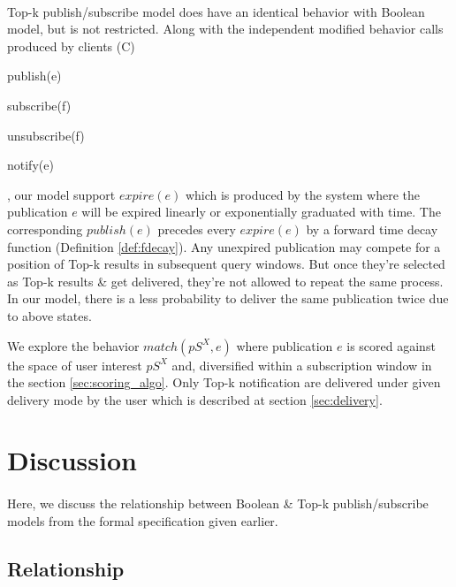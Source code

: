 \documentclass[a4paper,12pt,oneside]{book}
\theoremstyle{definition}
\theoremstyle{remark}
\begin{document}
\paragraph*{}
Top-k publish/subscribe model does have an identical behavior with Boolean model, but is not restricted. Along with the independent modified behavior calls produced by clients (C) \begin{enumerate*}[label=(\roman*)]
\item publish(e)
\item subscribe(f)
\item unsubscribe(f)
\item notify(e)
\end{enumerate*}
, our model support $expire(e)$ which is produced by the system where the publication $e$ will be expired linearly or exponentially graduated with time. The corresponding $publish(e)$ precedes every $expire(e)$ by a forward time decay function (Definition \ref{def:fdecay}). Any unexpired publication may compete for a position of Top-k results in subsequent query windows. But once they're selected as Top-k results \& get delivered, they're not allowed to repeat the same process. In our model, there is a less probability to deliver the same publication twice due to above states. 

We explore the behavior $match(pS^X,e)$ where publication $e$ is scored against the space of user interest $pS^X$ and, diversified within a subscription window in the section \ref{sec:scoring_algo}. Only Top-k notification are delivered under given delivery mode by the user which is described at section \ref{sec:delivery}. 

\section{Discussion}
\paragraph*{}
Here, we discuss the relationship between Boolean \& Top-k publish/subscribe models from the formal specification given earlier.
\subsection{Relationship}
\end{document}
